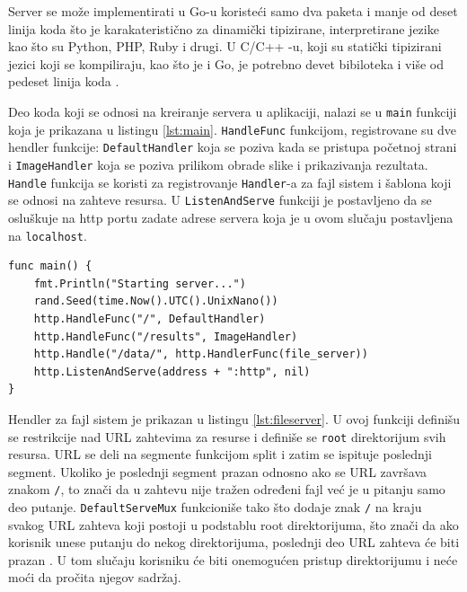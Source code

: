 \documentclass[12pt,oneside]{memoir}
\begin{document}
Server se može implementirati u Go-u  koristeći samo dva paketa i manje od deset linija koda što je karakateristično za dinamički tipizirane, interpretirane jezike kao što su Python, PHP, Ruby i drugi. U C/C++ -u, koji su statički tipizirani jezici koji se kompiliraju, kao što je i Go, je potrebno devet bibiloteka i više od pedeset linija koda \cite{server}.

Deo koda koji se odnosi na kreiranje servera u aplikaciji, nalazi se u \texttt{main} funkciji koja je prikazana u listingu \ref{lst:main}. \texttt{HandleFunc} funkcijom, registrovane su dve hendler funkcije: \texttt{DefaultHandler} koja se poziva kada se pristupa početnoj strani i \texttt{ImageHandler} koja se poziva prilikom obrade slike i prikazivanja rezultata. \texttt{Handle} funkcija se koristi za registrovanje \texttt{Handler}-a za fajl sistem i šablona koji se odnosi na zahteve resursa.  U \texttt{ListenAndServe} funkciji je postavljeno da se osluškuje na http portu zadate adrese servera koja je u ovom slučaju postavljena na \texttt{localhost}.

\begin{center}
\begin{lstlisting}[caption={Funkcija \texttt{main}, kreiranje servera},label={lst:main},  backgroundcolor=\color{background},belowskip=-0.7 \baselineskip ]
func main() {
	fmt.Println("Starting server...")
	rand.Seed(time.Now().UTC().UnixNano())
	http.HandleFunc("/", DefaultHandler)
	http.HandleFunc("/results", ImageHandler)
	http.Handle("/data/", http.HandlerFunc(file_server))
	http.ListenAndServe(address + ":http", nil)
}
\end{lstlisting}
\end{center}

\label{fileserver}Hendler za fajl sistem je prikazan u listingu \ref{lst:fileserver}. U ovoj funkciji definišu se restrikcije nad URL zahtevima za resurse i definiše se \texttt{root} direktorijum svih resursa. URL se deli na segmente funkcijom split i zatim se ispituje poslednji segment. Ukoliko je poslednji segment prazan odnosno ako se URL završava znakom \texttt{/}, to znači da u zahtevu nije tražen određeni fajl već je u pitanju samo deo putanje. \texttt{DefaultServeMux} funkcioniše tako što dodaje znak \texttt{/} na kraju svakog URL zahteva koji postoji u podstablu root direktorijuma, što znači da ako korisnik unese putanju do nekog direktorijuma, poslednji deo URL zahteva će biti prazan \cite{http}. U tom slučaju korisniku će biti onemogućen pristup direktorijumu i neće moći da pročita njegov sadržaj.
\end{document}
